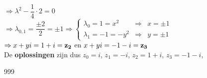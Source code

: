 \documentclass[a4paper]{article}
\begin{document}
$\Rightarrow \lambda^2 - \dfrac{1}{4} \cdot 2 = 0$ \\

$\Rightarrow \lambda_{0,1} = \dfrac{\pm 2}{2} = \pm 1 \Rightarrow \left\{
    \begin{array}{lcl}
    \lambda_0 = 1 = x^2   & \Rightarrow & x = \pm 1 \\
    \lambda_1 = -1 = -y^2 & \Rightarrow & y = \pm 1
\end{array}
\right.$ \\

$\Rightarrow x + yi = 1+i = {\bf z_2}$ en $x + yi = -1-i = {\bf z_3}$ \\

De \textbf{oplossingen} zijn dus $z_0 = i$, $z_1 = -i$, $z_2 = 1+i$, $z_3 = -1-i$, 

\begin{thebibliography}{999}
\end{thebibliography}
\end{document}
